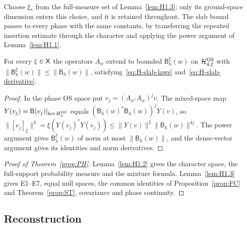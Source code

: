 Choose $\xi_*$ from the full-measure set of Lemma~\ref{lem:H1.3}; only its ground-space dimension enters this choice, and it is retained throughout. The slab bound passes to every phase with the same constants, by transferring the repeated insertion estimate through the character and applying the power argument of Lemma~\ref{lem:H1.1}.
\begin{corollary}\label{cor:H-phase-slabs}\label{cor:H-phase-slab}
For every $\xi\in\mathsf{X}$ the operators $A_w$ extend to bounded $\mathsf B_h^\xi(w)$ on $\mathcal H_{4,\xi}^{\rm OS}$ with $\|\mathsf B_h^\xi(w)\|\le\|\mathsf B_h(w)\|$, satisfying~\eqref{eq:H-slab-laws} and~\eqref{eq:H-slab-derivative}.
\end{corollary}
\begin{proof}
In the phase OS space put $v_j=(A_{w^\dagger}A_w)^jv$. The mixed-space map $Y(v_j)=\mathsf B(v_j)|_{\ker H_4^{\rm OS}}$ equals $(\mathsf B_h(w)^*\mathsf B_h(w))^jY(v)$, so $\|[v_j]_\xi\|^2=\xi(Y(v_j)^*Y(v_j))\le\|Y(v)\|^2\|\mathsf B_h(w)\|^{4j}$. The power argument gives $\mathsf B_h^\xi(w)$ of norm at most $\|\mathsf B_h(w)\|$, and the dense-vector argument gives its identities and norm derivatives.
\end{proof}

\begin{proof}[Proof of Theorem~\ref{prop:PH}]
Lemma~\ref{lem:H1.2} gives the character space, the full-support probability measure and the mixture formula. Lemma~\ref{lem:H1.3} gives E1--E7, equal null spaces, the common identities of Proposition~\ref{prop:FC} and Theorem~\ref{prop:ST}, covariance and phase continuity.
\end{proof}

\subsection{Reconstruction}\label{sec:partII-H.2}

